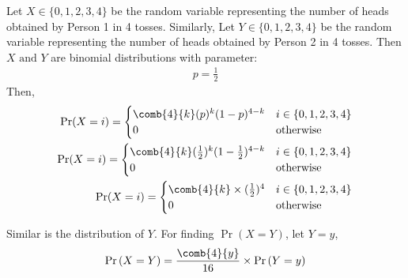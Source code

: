 %
Let $X \in \{ 0, 1, 2, 3, 4\}$ be the random variable representing the number of heads obtained by Person 1 in 4 tosses. Similarly, Let $Y \in \{ 0, 1, 2, 3, 4\}$ be the random variable representing the number of heads obtained by Person 2 in 4 tosses. Then $X \text{ and } Y$ are binomial distributions with parameter:
\begin{align}
    p = \frac{1}{2}
\end{align}
Then,
\begin{align}
    \Pr(X=i) = 
	\begin{cases}
	\comb{4}{k}(p)^k(1-p)^{4-k} &  i \in \{0, 1, 2, 3, 4\}\\ 
	0 & \text{otherwise}
	\end{cases}
	\\\Pr(X=i) = 
	\begin{cases}
	\comb{4}{k}(\frac{1}{2})^k(1-\frac{1}{2})^{4-k}  &  i \in \{0, 1, 2, 3, 4\}\\ 
	0 & \text{otherwise}
	\end{cases}
	\\\Pr(X=i) = 
	\begin{cases}
	\comb{4}{k}\times(\frac{1}{2})^4  &  i \in \{0, 1, 2, 3, 4\}\\ 
	0 & \text{otherwise}
	\end{cases}
\end{align}
\begin{center}
\begin{table}[h]
    \centering
    \caption{Probability distribution table of X}
    \label{table 1}
\end{table}
\end{center}
Similar is the distribution of $Y$. For finding $\Pr{(X=Y)}$, let $Y=y$,
\begin{align}
    \Pr{(X=Y)} = \frac{\comb{4}{y}}{16} \times \Pr{(Y=y)}
\end{align}

